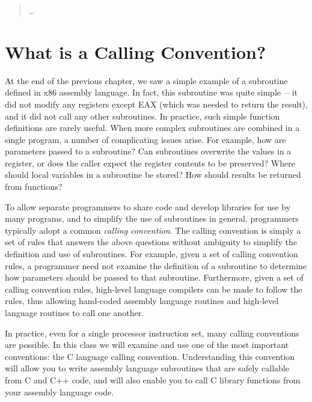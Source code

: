 \begin{quotation}
\ldots
\end{quotation}


\section{What is a Calling Convention?}

At the end of the previous chapter, we saw a simple
example of a subroutine defined in x86 assembly language. In fact,
this subroutine was quite simple~-- it did not modify any registers
except EAX (which was needed to return the result), and it did not
call any other subroutines. In practice, such simple function
definitions are rarely useful. When more complex subroutines are
combined in a single program, a number of complicating issues arise.
For example, how are parameters passed to a subroutine? Can
subroutines overwrite the values in a register, or does the caller
expect the register contents to be preserved? Where should local
variables in a subroutine be stored? How should results be returned
from functions?

To allow separate programmers to share code and develop libraries for
use by many programs, and to simplify the use of subroutines in
general, programmers typically adopt a common {\em calling
  convention}. The calling convention is simply a set of rules that
answers the above questions without ambiguity to simplify the
definition and use of subroutines. For example, given a set of calling
convention rules, a programmer need not examine the definition of a
subroutine to determine how parameters should be passed to that
subroutine. Furthermore, given a set of calling convention rules,
high-level language compilers can be made to follow the rules, thus
allowing hand-coded assembly language routines and high-level language
routines to call one another.

In practice, even for a single processor instruction set, many calling
conventions are possible.  In this class we will examine and use one
of the most important conventions: the C language calling convention.
Understanding this convention will allow you to write assembly
language subroutines that are safely callable from C and C++ code, and
will also enable you to call C library functions from your assembly
language code.

